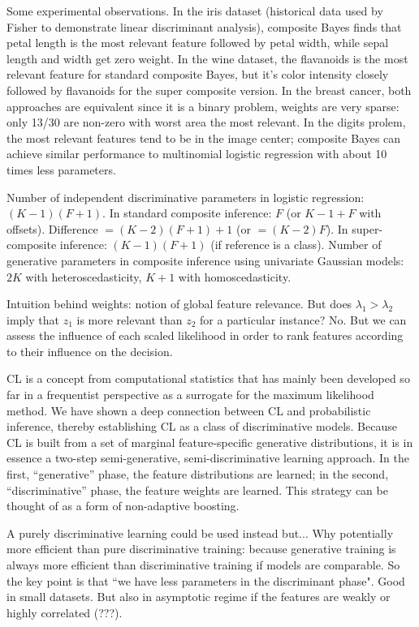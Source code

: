 \documentclass[english]{scrartcl}
\begin{document}
Some experimental observations. In the iris dataset (historical data used by Fisher to demonstrate linear discriminant analysis), composite Bayes finds that petal length is the most relevant feature followed by petal width, while sepal length and width get zero weight. In the wine dataset, the flavanoids is the most relevant feature for standard composite Bayes, but it's color intensity closely followed by flavanoids for the super composite version. In the breast cancer, both approaches are equivalent since it is a binary problem, weights are very sparse: only 13/30 are non-zero with worst area the most relevant. In the digits prolem, the most relevant features tend to be in the image center; composite Bayes can achieve similar performance to multinomial logistic regression with about 10 times less parameters.

Number of independent discriminative parameters in logistic regression: $(K-1)(F+1)$. In standard composite inference: $F$ (or $K-1+F$ with offsets). Difference $=(K-2)(F+1)+1$ (or $=(K-2)F$). In super-composite inference: $(K-1)(F+1)$ (if reference is a class). Number of generative parameters in composite inference using univariate Gaussian models: $2K$ with heteroscedasticity, $K+1$ with homoscedasticity.

Intuition behind weights: notion of global feature relevance. But does $\lambda_1>\lambda_2$ imply that $z_1$ is more relevant than $z_2$ for a particular instance? No. But we can assess the influence of each scaled likelihood in order to rank features according to their influence on the decision.

CL is a concept from computational statistics that has mainly been developed so far in a frequentist perspective as a surrogate for the maximum likelihood method. We have shown a deep connection between CL and probabilistic inference, thereby establishing CL as a class of discriminative models. Because CL is built from a set of marginal feature-specific generative distributions, it is in essence a two-step semi-generative, semi-discriminative learning approach. In the first, ``generative'' phase, the feature distributions are learned; in the second, ``discriminative'' phase, the feature weights are learned. This strategy can be thought of as a form of non-adaptive boosting.


A purely discriminative learning could be used instead but...
Why potentially more efficient than pure discriminative training: because generative training is always more efficient than discriminative training if models are comparable. So the key point is that ``we have less parameters in the discriminant phase". Good in small datasets. But also in asymptotic regime if the features are weakly or highly correlated (???).
\end{document}
